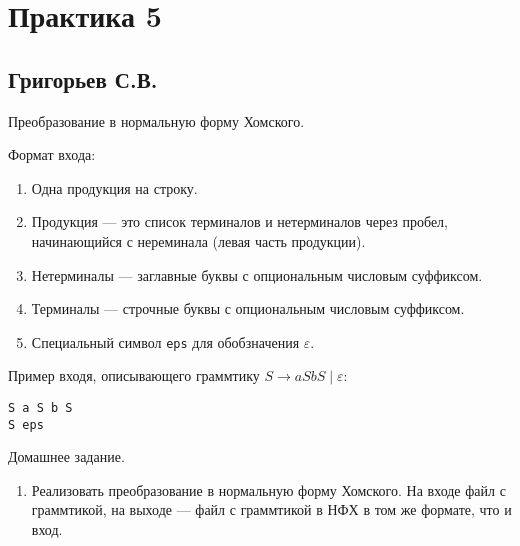 \section{Практика 5}

\subsection{Григорьев С.В.}

Преобразование в нормальную форму Хомского.

Формат входа:
\begin{enumerate}
\item Одна продукция на строку.
\item Продукция --- это список терминалов и нетерминалов через пробел, начинающийся с нереминала (левая часть продукции).
\item Нетерминалы --- заглавные буквы с опциональным числовым суффиксом.
\item Терминалы --- строчные буквы с опциональным числовым суффиксом.
\item Специальный символ \verb|eps| для обобзначения $\varepsilon$.
\end{enumerate}

Пример входя, описывающего граммтику $S \to a S b S \mid \varepsilon$:

\begin{verbatim}
S a S b S
S eps
\end{verbatim}

Домашнее задание.
\begin{enumerate}
    \item Реализовать преобразование в нормальную форму Хомского. На входе файл с граммтикой, на выходе --- файл с граммтикой в НФХ в том же формате, что и вход.
\end{enumerate}
